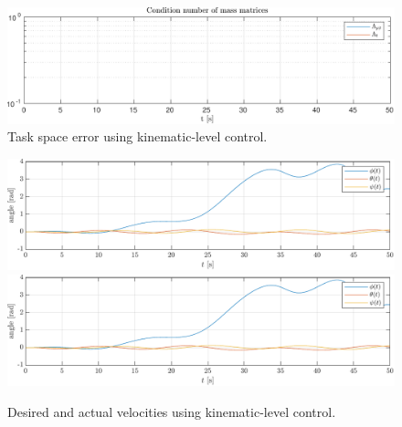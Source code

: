 \begin{figure}[h!]
    \centering
    \includegraphics[page=2,width=\linewidth]{assets/results/kinematic/h5data.pdf}
    \caption{Task space error using kinematic-level control.}
    \label{fig:kin:task_error}
\end{figure}
\begin{figure}[h!]
    \centering
    \includegraphics[page=9,width=\linewidth]{assets/results/kinematic/plot.pdf}
    \includegraphics[page=10,width=\linewidth]{assets/results/kinematic/plot.pdf}
    \caption{Desired and actual velocities using kinematic-level control.}
    \label{fig:kin:vel_des}
\end{figure}
